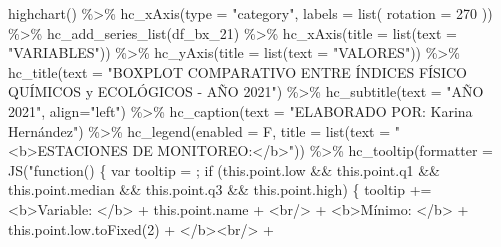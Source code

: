 \documentclass[
  10pt,
  letterpaper,
  DIV=11,
  numbers=noendperiod]{scrreprt}
\newenvironment{Shaded}{\begin{snugshade}}{\end{snugshade}}
\newcommand{\AttributeTok}[1]{\textcolor[rgb]{0.40,0.45,0.13}{#1}}
\newcommand{\DecValTok}[1]{\textcolor[rgb]{0.68,0.00,0.00}{#1}}
\newcommand{\FunctionTok}[1]{\textcolor[rgb]{0.28,0.35,0.67}{#1}}
\newcommand{\NormalTok}[1]{\textcolor[rgb]{0.00,0.23,0.31}{#1}}
\newcommand{\SpecialCharTok}[1]{\textcolor[rgb]{0.37,0.37,0.37}{#1}}
\newcommand{\StringTok}[1]{\textcolor[rgb]{0.13,0.47,0.30}{#1}}
\begin{document}
\begin{Shaded}
\begin{Highlighting}[numbers=left,,]
\FunctionTok{highchart}\NormalTok{() }\SpecialCharTok{\%\textgreater{}\%}
    \FunctionTok{hc\_xAxis}\NormalTok{(}\AttributeTok{type =} \StringTok{"category"}\NormalTok{,}
             \AttributeTok{labels =} \FunctionTok{list}\NormalTok{(}
                 \AttributeTok{rotation =} \DecValTok{270}
\NormalTok{             )) }\SpecialCharTok{\%\textgreater{}\%}
    \FunctionTok{hc\_add\_series\_list}\NormalTok{(df\_bx\_21) }\SpecialCharTok{\%\textgreater{}\%}
    \FunctionTok{hc\_xAxis}\NormalTok{(}\AttributeTok{title =} \FunctionTok{list}\NormalTok{(}\AttributeTok{text =} \StringTok{"VARIABLES"}\NormalTok{)) }\SpecialCharTok{\%\textgreater{}\%}
    \FunctionTok{hc\_yAxis}\NormalTok{(}\AttributeTok{title =} \FunctionTok{list}\NormalTok{(}\AttributeTok{text =} \StringTok{"VALORES"}\NormalTok{)) }\SpecialCharTok{\%\textgreater{}\%}
    \FunctionTok{hc\_title}\NormalTok{(}\AttributeTok{text =} \StringTok{"BOXPLOT COMPARATIVO ENTRE ÍNDICES FÍSICO QUÍMICOS y ECOLÓGICOS {-} AÑO 2021"}\NormalTok{) }\SpecialCharTok{\%\textgreater{}\%}
    \FunctionTok{hc\_subtitle}\NormalTok{(}\AttributeTok{text =} \StringTok{"AÑO 2021"}\NormalTok{, }\AttributeTok{align=}\StringTok{"left"}\NormalTok{) }\SpecialCharTok{\%\textgreater{}\%}
    \FunctionTok{hc\_caption}\NormalTok{(}\AttributeTok{text =} \StringTok{"ELABORADO POR: Karina Hernández"}\NormalTok{) }\SpecialCharTok{\%\textgreater{}\%}
    \FunctionTok{hc\_legend}\NormalTok{(}\AttributeTok{enabled =}\NormalTok{ F, }\AttributeTok{title =} \FunctionTok{list}\NormalTok{(}\AttributeTok{text =} \StringTok{"\textless{}b\textgreater{}ESTACIONES DE MONITOREO:\textless{}/b\textgreater{}"}\NormalTok{)) }\SpecialCharTok{\%\textgreater{}\%}
    \FunctionTok{hc\_tooltip}\NormalTok{(}\AttributeTok{formatter =} \FunctionTok{JS}\NormalTok{(}\StringTok{"function() \{}
\StringTok{    var tooltip = \textquotesingle{}\textquotesingle{};}
\StringTok{    if (this.point.low \&\& this.point.q1 \&\& this.point.median \&\& this.point.q3 \&\& this.point.high) \{}
\StringTok{        tooltip += \textquotesingle{}\textless{}b\textgreater{}Variable: \textless{}/b\textgreater{}\textquotesingle{} + this.point.name + \textquotesingle{}\textless{}br/\textgreater{}\textquotesingle{} +}
\StringTok{                   \textquotesingle{}\textless{}b\textgreater{}Mínimo: \textless{}/b\textgreater{}\textquotesingle{} + this.point.low.toFixed(2) + \textquotesingle{}\textless{}/b\textgreater{}\textless{}br/\textgreater{}\textquotesingle{} +}

\end{Highlighting}
\end{Shaded}
\end{document}
